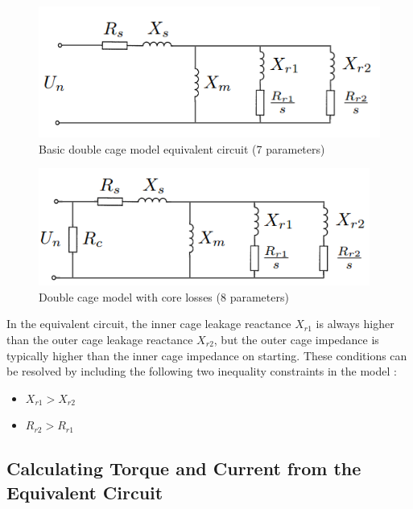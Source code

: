 \documentclass{article}
\begin{document}
\begin{figure}[htp]
\begin{center}
\includegraphics[scale=0.85]{./Figures/Dbl_cage_equiv_circuit.png}
\caption{Basic double cage model equivalent circuit (7 parameters)}
\label{fig:double_cage_model}
\end{center}
\end{figure}

\begin{figure}[!ht]
\begin{center}
\includegraphics[scale=0.85]{./Figures/dbl_cage.png}
\caption{Double cage model with core losses (8 parameters)}
\label{fig:double_cage_core_losses}
\end{center}
\end{figure}

In the equivalent circuit, the inner cage leakage reactance $X_{r1}$ is always higher than the outer cage leakage reactance $X_{r2}$, but the outer cage impedance is typically higher than the inner cage impedance on starting. These conditions can be resolved by including the following two inequality constraints in the model \cite{pedra_2004}:

\begin{itemize}
\item $X_{r1} > X_{r2}$
\item $R_{r2} > R_{r1}$
\end{itemize}

\subsection{Calculating Torque and Current from the Equivalent Circuit}
\label{calc_torque}
\end{document}
